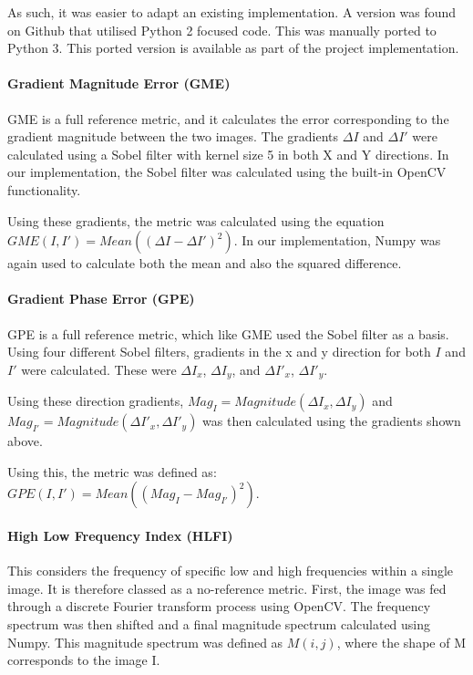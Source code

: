 \documentclass[12pt,a4paper]{article}
\begin{document}
                As such, it was easier to adapt an existing implementation. A version was found on Github that utilised Python 2 focused code. This was manually ported to Python 3. \cite{BIQIImplementation} This ported version is available as part of the project implementation.

            \paragraph{Gradient Magnitude Error (GME)}
            GME is a full reference metric, and it calculates the error corresponding to the gradient magnitude between the two images. The gradients $\Delta I$ and $\Delta I'$
            were calculated using a Sobel filter with kernel size 5 in both X and Y directions. In our implementation, the Sobel filter was calculated using the built-in OpenCV functionality.

                Using these gradients, the metric was calculated using the equation $GME(I, I') = Mean((\Delta I - \Delta I')^2)$. In our implementation, Numpy was again used to calculate both the mean and
                also the squared difference.

            \paragraph{Gradient Phase Error (GPE)}
                GPE is a full reference metric, which like GME used the Sobel filter as a basis. Using four different Sobel filters, gradients in the x and y direction for both
                $I$ and $I'$ were calculated. These were $\Delta I_x$, $\Delta I_y$, and $\Delta I'_x$, $\Delta I'_y$.

                Using these direction gradients, $Mag_{I} = Magnitude(\Delta I_x, \Delta I_y)$ and $Mag_{I'} = Magnitude(\Delta I'_x, \Delta I'_y)$ was then calculated using the gradients shown above.

                Using this, the metric was defined as: $GPE(I, I') = Mean((Mag_{I} - Mag_{I'})^2)$.

            \paragraph{High Low Frequency Index (HLFI)}
                This considers the frequency of specific low and high frequencies within a single image. It is therefore classed as a no-reference metric.
                First, the image was fed through a discrete Fourier transform process using OpenCV. The frequency spectrum was then shifted and a final magnitude spectrum calculated using Numpy. This magnitude spectrum was defined as $M(i, j)$, where the shape of M corresponds to the image I.
\end{document}
